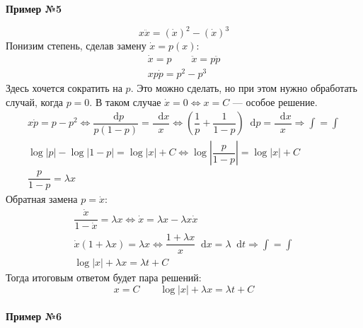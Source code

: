\documentclass[a4paper,12pt]{article}
\renewcommand*\d{\mathop{}\!\mathrm{d}}
\newcommand{\dpp}{\dot{p}}
\newcommand{\ddpp}{\ddot{p}}
\newcommand{\dx}{\dot{x}}
\newcommand{\ddx}{\ddot{x}}
\newcommand{\bto}{\Longrightarrow}
\newcommand{\ds}{\displaystyle}
\begin{document}
\textbf{Пример №5}

\[x\ddx = (\dx)^2 - (\dx)^3\]
Понизим степень, сделав замену $\dx = p(x)$:
\begin{gather*}
	\dx = p\qquad\ddx = p\ddpp \\
	xp\dpp = p^2 - p^3
\end{gather*}
Здесь хочется сократить на $p$. Это можно сделать, но при этом нужно обработать случай, когда $p = 0$. В таком случае $\dx = 0 \iff x = C$ --- особое решение.
\begin{gather*}
	x\dpp = p - p^2 \iff \dfrac{\d p}{p(1 - p)} = \dfrac{\d x}{x} \iff \left(\dfrac{1}{p} + \dfrac{1}{1 - p}\right)\d p = \dfrac{\d x}{x}\bto \ds\int = \int\\
	\log|p| - \log|1 - p| = \log|x| + C \iff \log\left|\dfrac{p}{1 - p}\right| = \log|x| + C\\
	\dfrac{p}{1 - p} = \lambda x
\end{gather*}
Обратная замена $p = \dx$:
\begin{gather*}
	\dfrac{\dx}{1 - \dx} = \lambda x \iff \dx = \lambda x - \lambda x\dx\\
	\dx(1 + \lambda x) = \lambda x \iff \dfrac{1 + \lambda x}{x}\d x = \lambda \d t \bto \ds\int = \int\\
	\log|x| + \lambda x = \lambda t + C
\end{gather*}
Тогда итоговым ответом будет пара решений:
\[x = C \qquad \log|x| + \lambda x = \lambda t + C\]
\ \\

\textbf{Пример №6}
\end{document}
